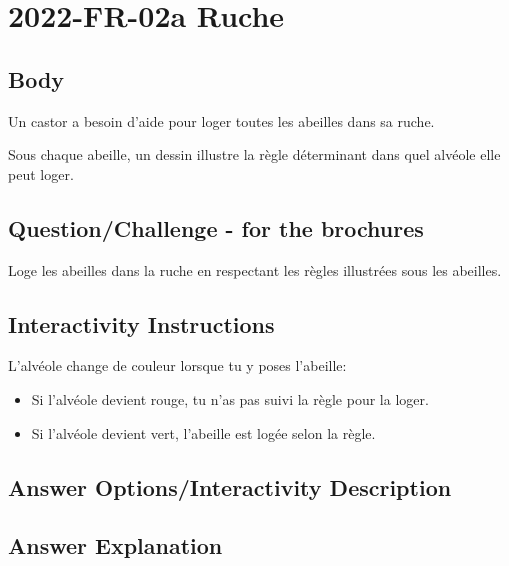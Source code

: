 \documentclass[a4paper,11pt]{report}
\newcommand{\taskGraphicsFolder}{..}
\begin{document}
\section*{\centering{} 2022-FR-02a Ruche}


\subsection*{Body}

Un castor a besoin d’aide pour loger toutes les abeilles dans sa ruche.

{\centering%
\par}

Sous chaque abeille, un dessin illustre la règle déterminant dans quel alvéole elle peut loger.

{\em


\subsection*{Question/Challenge - for the brochures}

Loge les abeilles dans la ruche en respectant les règles illustrées sous les abeilles.

}


\subsection*{Interactivity Instructions}

L’alvéole change de couleur lorsque tu y poses l’abeille:

\begin{itemize}
  \item Si l’alvéole devient rouge, tu n’as pas suivi la règle pour la loger.
  \item Si l’alvéole devient vert, l’abeille est logée selon la règle.
\end{itemize}

\begingroup
\renewcommand{\arraystretch}{1.5}
\subsection*{Answer Options/Interactivity Description}



\endgroup

\subsection*{Answer Explanation}
\end{document}
